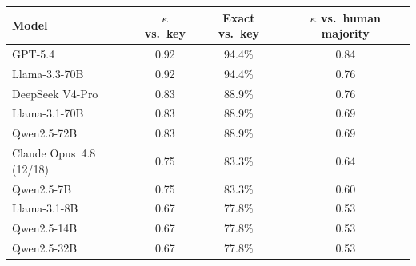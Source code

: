 \begin{tabular}{lccc}
\toprule
Model & $\kappa$ vs.\ key & Exact vs.\ key & $\kappa$ vs.\ human majority \\
\midrule
GPT-5.4 & 0.92 & 94.4\% & 0.84 \\
Llama-3.3-70B & 0.92 & 94.4\% & 0.76 \\
DeepSeek V4-Pro & 0.83 & 88.9\% & 0.76 \\
Llama-3.1-70B & 0.83 & 88.9\% & 0.69 \\
Qwen2.5-72B & 0.83 & 88.9\% & 0.69 \\
Claude Opus~4.8 (12/18) & 0.75 & 83.3\% & 0.64 \\
Qwen2.5-7B & 0.75 & 83.3\% & 0.60 \\
Llama-3.1-8B & 0.67 & 77.8\% & 0.53 \\
Qwen2.5-14B & 0.67 & 77.8\% & 0.53 \\
Qwen2.5-32B & 0.67 & 77.8\% & 0.53 \\
\bottomrule
\end{tabular}
